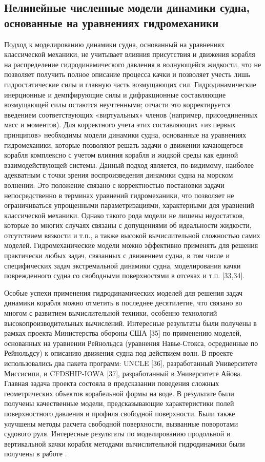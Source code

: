 \subsection{Нелинейные численные модели динамики судна, основанные на уравнениях гидромеханики}
Подход к моделированию динамики судна, основанный на уравнениях классической механики, не учитывает влияния присутствия и движения корабля на распределение гидродинамического давления в волнующейся жидкости, что не позволяет получить полное описание процесса качки и позволяет учесть лишь гидростатические силы и главную часть возмущающих сил. Гидродинамические инерционные и демпфирующие силы и дифракционные составляющие возмущающей силы остаются неучтенными; отчасти это корректируется введением соответствующих «виртуальных» членов (например, присоединенных масс и моментов). Для корректного учета этих составляющих «из первых принципов» необходимы модели динамики судна, основанные на уравнениях гидромеханики, которые позволяют решать задачи о движении качающегося корабля комплексно с учетом влияния корабля и жидкой среды как единой взаимодействующей системы. Данный подход является, по-видимому, наиболее адекватным с точки зрения воспроизведения динамики судна на морском волнении. Это положение связано с корректностью постановки задачи непосредственно в терминах уравнений гидромеханики, что позволяет не ограничиваться упрощенными параметризациями, характерными для уравнений классической механики. Однако такого рода модели не лишены недостатков, которые во многих случаях связаны с допущениями об идеальности жидкости, отсутствием вязкости и т.п., а также высокой вычислительной сложностью самих моделей. Гидромеханические модели можно эффективно применять для решения практически любых задач, связанных с движением судна, в том числе и специфических задач экстремальной динамики судна, моделирования качки поврежденного судна со свободными поверхностями в отсеках и т.п. [33,34].

Особые успехи применения гидродинамических моделей для решения задач динамики корабля можно отметить в последнее десятилетие, что связано во многом с развитием вычислительной техники, особенно технологий высокопроизводительных вычислений. Интересные результаты были получены в рамках проекта Министерства обороны США [35] по применению моделей, основанных на уравнении Рейнольдса (уравнения Навье-Стокса, осредненные по Рейнольдсу) к описанию движения судна под действием волн. В проекте использовались два пакета программ: UNCLE [36], разработанный Университете Миссисипи, и CFDSHIP-IOWA [37], разработанный в Университете Айова. Главная задача проекта состояла в предсказании поведения сложных геометрических объектов корабельной формы на воде. В результате были получены качественные модели, предсказывающие характеристики полей поверхностного давления и профиля свободной поверхности. Были также улучшены методы расчета свободной поверхности, вызванные поворотами судового руля. Интересные результаты по моделированию продольной и вертикальной качки корабля методами вычислительной гидродинамики были получены в работе \citep{dk38}.

